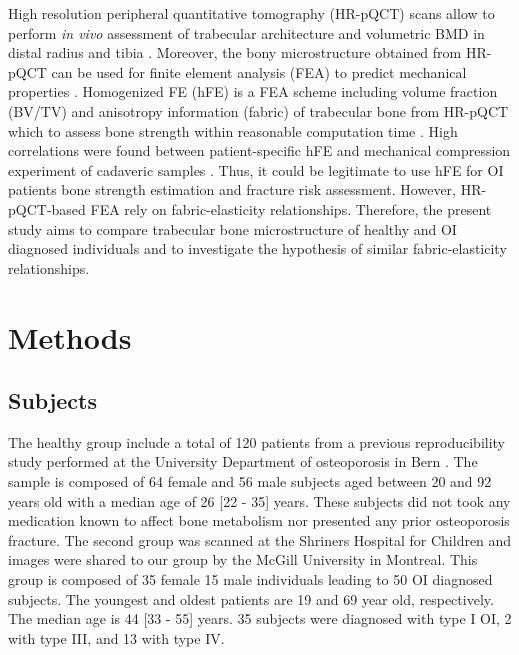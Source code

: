 \documentclass[a4paper,fleqn]{DC_ArtStyle}
\begin{document}
High resolution peripheral quantitative tomography (HR-pQCT) scans allow to perform \textit{in vivo} assessment of trabecular architecture and volumetric BMD in distal radius and tibia \cite{Boutroy2005}. Moreover, the bony microstructure obtained from HR-pQCT can be used for finite element analysis (FEA) to predict mechanical properties \cite{Boutroy2008}. Homogenized FE (hFE) is a FEA scheme including volume fraction (BV/TV) and anisotropy information (fabric) of trabecular bone from HR-pQCT which to assess bone strength within reasonable computation time \cite{Pahr2009}. High correlations were found between patient-specific hFE and mechanical compression experiment of cadaveric samples \cite{Varga2011,AriasMoreno2019}. Thus, it could be legitimate to use hFE for OI patients bone strength estimation and fracture risk assessment. However, HR-pQCT-based FEA rely on fabric-elasticity relationships. Therefore, the present study aims to compare trabecular bone microstructure of healthy and OI diagnosed individuals and to investigate the hypothesis of similar fabric-elasticity relationships.

\section{Methods}

\subsection{Subjects}
The healthy group include a total of 120 patients from a previous reproducibility study performed at the University Department of osteoporosis in Bern \cite{Schenk2020}. The sample is composed of 64 female and 56 male subjects aged between 20 and 92 years old with a median age of 26 [22 - 35] years. These subjects did not took any medication known to affect bone metabolism nor presented any prior osteoporosis fracture. The second group was scanned at the Shriners Hospital for Children and images were shared to our group by the McGill University in Montreal. This group is composed of 35 female 15 male individuals leading to 50 OI diagnosed subjects. The youngest and oldest patients are 19 and 69 year old, respectively. The median age is 44 [33 - 55] years. 35 subjects were diagnosed with type I OI, 2 with type III, and 13 with type IV.
\end{document}
